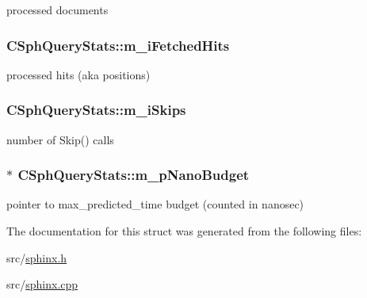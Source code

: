 processed documents 

\hypertarget{structCSphQueryStats_a097db9dbdd7828bd51397c8346fc9c99}{
\subsubsection[{m\-\_\-i\-Fetched\-Hits}]{ C\-Sph\-Query\-Stats\-::m\-\_\-i\-Fetched\-Hits}}\label{structCSphQueryStats_a097db9dbdd7828bd51397c8346fc9c99}


processed hits (aka positions) 

\hypertarget{structCSphQueryStats_a1ae88398f284f58e6e6fe83319d62f1a}{
\subsubsection[{m\-\_\-i\-Skips}]{ C\-Sph\-Query\-Stats\-::m\-\_\-i\-Skips}}\label{structCSphQueryStats_a1ae88398f284f58e6e6fe83319d62f1a}


number of Skip() calls 

\hypertarget{structCSphQueryStats_a834d9a42e0441d58d8a2bb70818c13a8}{
\subsubsection[{m\-\_\-p\-Nano\-Budget}]{$\ast$ C\-Sph\-Query\-Stats\-::m\-\_\-p\-Nano\-Budget}}\label{structCSphQueryStats_a834d9a42e0441d58d8a2bb70818c13a8}


pointer to max\-\_\-predicted\-\_\-time budget (counted in nanosec) 



The documentation for this struct was generated from the following files\-:\begin{DoxyCompactItemize}
\item 
src/\hyperlink{sphinx_8h}{sphinx.\-h}\item 
src/\hyperlink{sphinx_8cpp}{sphinx.\-cpp}\end{DoxyCompactItemize}
